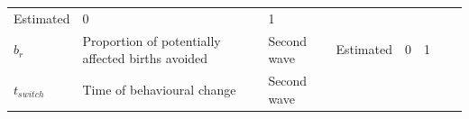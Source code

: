 \documentclass[10pt,letterpaper]{article}
\begin{document}
\begin{longtable}[]{@{}llllllll@{}}
\begin{minipage}[t]{0.05\columnwidth}
Estimated\strut
\end{minipage} & \begin{minipage}[t]{0.04\columnwidth}\raggedright\strut
0\strut
\end{minipage} & \begin{minipage}[t]{0.04\columnwidth}\raggedright\strut
1\strut
\end{minipage} & \begin{minipage}[t]{0.14\columnwidth}\raggedright\strut
\strut
\end{minipage} & \begin{minipage}[t]{0.26\columnwidth}\raggedright\strut
\strut
\end{minipage}\tabularnewline
\begin{minipage}[t]{0.04\columnwidth}\raggedright\strut
\(b_r\)\strut
\end{minipage} & \begin{minipage}[t]{0.17\columnwidth}\raggedright\strut
Proportion of potentially affected births avoided\strut
\end{minipage} & \begin{minipage}[t]{0.05\columnwidth}\raggedright\strut
Second wave\strut
\end{minipage} & \begin{minipage}[t]{0.05\columnwidth}\raggedright\strut
Estimated\strut
\end{minipage} & \begin{minipage}[t]{0.04\columnwidth}\raggedright\strut
0\strut
\end{minipage} & \begin{minipage}[t]{0.04\columnwidth}\raggedright\strut
1\strut
\end{minipage} & \begin{minipage}[t]{0.14\columnwidth}\raggedright\strut
\strut
\end{minipage} & \begin{minipage}[t]{0.26\columnwidth}\raggedright\strut
\strut
\end{minipage}\tabularnewline
\begin{minipage}[t]{0.04\columnwidth}\raggedright\strut
\(t_{switch}\)\strut
\end{minipage} & \begin{minipage}[t]{0.17\columnwidth}\raggedright\strut
Time of behavioural change\strut
\end{minipage} & \begin{minipage}[t]{0.05\columnwidth}\raggedright\strut
Second wave\strut
\end{minipage} & \begin{minipage}[t]{0.05\columnwidth}\raggedright\strut

\end{minipage}
\end{longtable}
\end{document}
